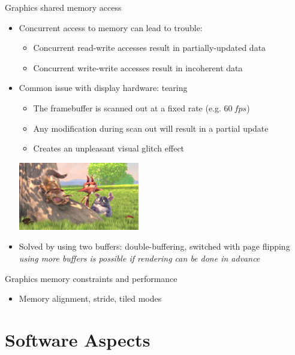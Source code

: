\begin{frame}{Graphics shared memory access}
  \begin{itemize}
  \item Concurrent access to memory can lead to trouble:
    \begin{itemize}
    \item Concurrent read-write accesses result in partially-updated data
    \item Concurrent write-write accesses result in incoherent data
    \end{itemize}
  \item Common issue with display hardware: tearing
    \begin{itemize}
    \item The framebuffer is scanned out at a fixed rate (e.g. \(60~fps\))
    \item Any modification during scan out will result in a partial update
    \item Creates an unpleasant visual glitch effect
    \end{itemize}
\begin{center}
\includegraphics[height=8em]{slides/graphics-introduction/tearing-glitch.jpg}
\end{center}
  \item Solved by using two buffers: double-buffering, switched with page flipping\\
    \textit{using more buffers is possible if rendering can be done in advance}
  \end{itemize}
\end{frame}

\begin{frame}{Graphics memory constraints and performance}
  \begin{itemize}
  \item Memory alignment, stride, tiled modes
  \end{itemize}
\end{frame}

\section{Software Aspects}


